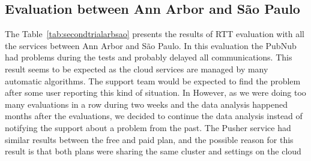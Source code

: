 \subsection*{Evaluation between Ann Arbor and São Paulo} 

The Table~\ref{tab:secondtrialarbsao} presents the results of RTT evaluation with all the services between Ann Arbor and São Paulo.
In this evaluation the PubNub had problems during the tests and probably delayed all communications.
This result seems to be expected as the cloud services are managed by many automatic algorithms.
The support team would be expected to find the problem after some user reporting this kind of situation.
In 
However, as we were doing too many evaluations in a row during two weeks and the data analysis happened months after the evaluations, we decided to continue the data analysis instead of notifying the support about a problem from the past.
The Pusher service had similar results between the free and paid plan, and the possible reason for this result is that both plans were sharing the same cluster and settings on the cloud


